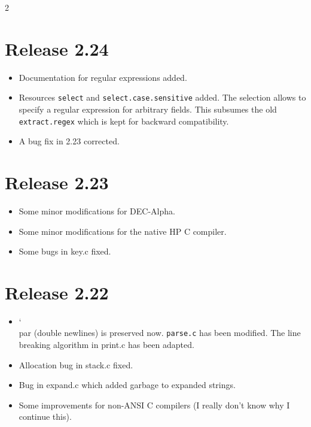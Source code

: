 \documentclass[11pt,a4paper]{scrartcl}
\newcommand\rsc[1]{\texttt{#1}}
\newcommand\File[1]{\textsf{#1}}
\newenvironment{Releases}{\begin{multicols}2\RaggedRight}{\end{multicols}}
\newenvironment{Release}[2]{%
  \def\tmp{#2}%
  \section*{Release #1 \ifx\tmp\empty\else{\normalsize[#2]}\fi}
  \begin{itemize}
}{\end{itemize}}
\newenvironment{Fix}[1]{\item }{}
\newenvironment{New}[1]{\item }{}
\newenvironment{Doc}[1]{\item }{}
\newenvironment{Update}[1]{\item }{}
\newcommand\BS{\char`\\}
\begin{document}
\begin{Releases}
 \begin{Release}{2.24}{}
  \begin{Doc}{gene}
    Documentation for regular expressions added.
  \end{Doc}
  \begin{New}{gene}
    Resources \rsc{select} and
    \rsc{select.case.sensitive} added. The selection allows to
    specify a regular expression for arbitrary fields. This subsumes
    the old \rsc{extract.regex} which is kept for backward
    compatibility.
  \end{New}
  \begin{Fix}{gene}
    A bug fix in 2.23 corrected.
  \end{Fix}
 \end{Release}

 \begin{Release}{2.23}{}
  \begin{Update}{gene}
    Some minor modifications for DEC-Alpha.
  \end{Update}
  \begin{Update}{gene}
    Some minor modifications for the native HP C compiler.
  \end{Update}
  \begin{Fix}{gene}
    Some bugs in \File{key.c} fixed.
  \end{Fix}
 \end{Release}

 \begin{Release}{2.22}{}
  \begin{Update}{gene}
    \BS par (double newlines) is preserved now. \rsc{parse.c}
    has been modified. The line breaking algorithm in \File{print.c}
    has been adapted.
  \end{Update}
  \begin{Fix}{gene}
    Allocation bug in \File{stack.c} fixed.
  \end{Fix}
  \begin{Fix}{gene}
    Bug in \File{expand.c} which added garbage to expanded strings.
  \end{Fix}
  \begin{Update}{gene}
    Some improvements for non-ANSI C compilers (I really don't know
    why I continue this).
  \end{Update}
 \end{Release}


\end{Releases}
\end{document}
